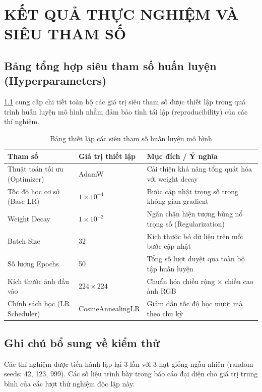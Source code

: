 
\chapter{KẾT QUẢ THỰC NGHIỆM VÀ SIÊU THAM SỐ}
\label{app:hyperparams}

\section{Bảng tổng hợp siêu tham số huấn luyện (Hyperparameters)}

\cref{tab:hyperparams} cung cấp chi tiết toàn bộ các giá trị siêu tham số được thiết lập trong quá trình huấn luyện mô hình nhằm đảm bảo tính tái lập (reproducibility) của các thí nghiệm.

\begin{table}[htbp]
\centering
\caption{Bảng thiết lập các siêu tham số huấn luyện mô hình}
\label{tab:hyperparams}
\begin{tabularx}{\textwidth}{l l X}
    \toprule
    \textbf{Tham số} & \textbf{Giá trị thiết lập} & \textbf{Mục đích / Ý nghĩa} \\
    \midrule
    Thuật toán tối ưu (Optimizer) & AdamW & Cải thiện khả năng tổng quát hóa với weight decay \\
    Tốc độ học cơ sở (Base LR)   & $1 \times 10^{-4}$ & Bước cập nhật trọng số trong không gian gradient \\
    Weight Decay                   & $1 \times 10^{-2}$ & Ngăn chặn hiện tượng bùng nổ trọng số (Regularization) \\
    Batch Size                     & 32                 & Kích thước bó dữ liệu trên mỗi bước cập nhật \\
    Số lượng Epochs                & 50                 & Tổng số lượt duyệt qua toàn bộ tập huấn luyện \\
    Kích thước ảnh đầu vào         & $224 \times 224$   & Chuẩn hóa chiều rộng $\times$ chiều cao ảnh RGB \\
    Chính sách học (LR Scheduler) & CosineAnnealingLR  & Giảm dần tốc độ học mượt mà theo chu kỳ \\
    \bottomrule
\end{tabularx}
\end{table}

\section{Ghi chú bổ sung về kiểm thử}

Các thí nghiệm được tiến hành lặp lại 3 lần với 3 hạt giống ngẫu nhiên (random seeds: 42, 123, 999). Các số liệu trình bày trong báo cáo đại diện cho giá trị trung bình của các lượt thử nghiệm độc lập này.
